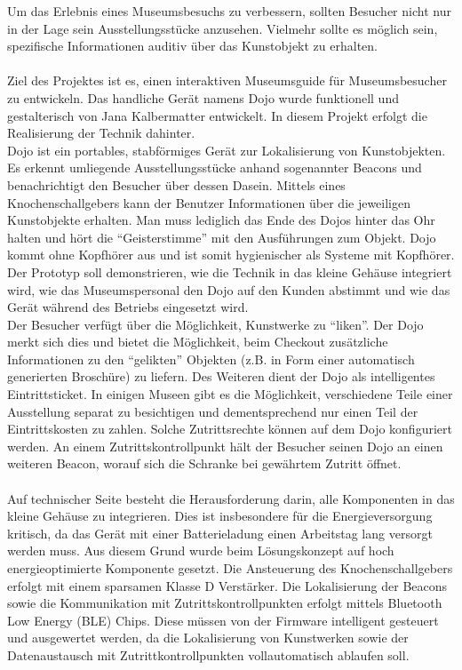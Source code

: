 Um das Erlebnis eines Museumsbesuchs zu verbessern, sollten Besucher nicht nur in der Lage sein Ausstellungsstücke anzusehen. Vielmehr sollte es möglich sein, spezifische Informationen auditiv über das Kunstobjekt zu erhalten.\\\\
Ziel des Projektes ist es, einen interaktiven Museumsguide für Museumsbesucher zu entwickeln. Das handliche Gerät namens Dojo wurde funktionell und gestalterisch von Jana Kalbermatter entwickelt. In diesem Projekt erfolgt die Realisierung der Technik dahinter. \\
Dojo ist ein portables, stabförmiges Gerät zur Lokalisierung von Kunstobjekten. Es erkennt umliegende Ausstellungsstücke anhand sogenannter Beacons und benachrichtigt den Besucher über dessen Dasein. Mittels eines Knochenschallgebers kann der Benutzer Informationen über die jeweiligen Kunstobjekte erhalten. Man muss lediglich das Ende des Dojos hinter das Ohr halten und hört die ``Geisterstimme'' mit den Ausführungen zum Objekt. Dojo kommt ohne Kopfhörer aus und ist somit hygienischer als Systeme mit Kopfhörer.
Der Prototyp soll demonstrieren, wie die Technik in das kleine Gehäuse integriert wird, wie das Museumspersonal den Dojo auf den Kunden abstimmt und wie das Gerät während des Betriebs eingesetzt wird.\\
Der Besucher verfügt über die Möglichkeit, Kunstwerke zu ``liken''. Der Dojo merkt sich dies und bietet die Möglichkeit, beim Checkout zusätzliche Informationen zu den ``gelikten'' Objekten (z.B. in Form einer automatisch generierten Broschüre) zu liefern.
Des Weiteren dient der Dojo als intelligentes Eintrittsticket. In einigen Museen gibt es die Möglichkeit, verschiedene Teile einer Ausstellung separat zu besichtigen und dementsprechend nur einen Teil der Eintrittskosten zu zahlen. Solche Zutrittsrechte können auf dem Dojo konfiguriert werden. An einem Zutrittskontrollpunkt hält der Besucher seinen Dojo an einen weiteren Beacon, worauf sich die Schranke bei gewährtem Zutritt öffnet.\\\\
Auf technischer Seite besteht die Herausforderung darin, alle Komponenten in das kleine Gehäuse zu integrieren. Dies ist insbesondere für die Energieversorgung kritisch, da das Gerät mit einer Batterieladung einen Arbeitstag lang versorgt werden muss. Aus diesem Grund wurde beim Lösungskonzept auf hoch energieoptimierte Komponente gesetzt. Die Ansteuerung des Knochenschallgebers erfolgt mit einem sparsamen Klasse D Verstärker. Die Lokalisierung der Beacons sowie die Kommunikation mit Zutrittskontrollpunkten erfolgt mittels Bluetooth Low Energy (BLE) Chips. Diese müssen von der Firmware intelligent gesteuert und ausgewertet werden, da die Lokalisierung von Kunstwerken sowie der Datenaustausch mit Zutrittkontrollpunkten vollautomatisch ablaufen soll.\\\\
